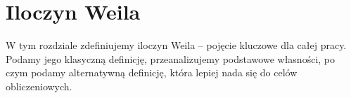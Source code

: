 \chapter{Iloczyn Weila}

W tym rozdziale zdefiniujemy iloczyn Weila -- pojęcie kluczowe dla całej pracy.
Podamy jego klasyczną definicję, przeanalizujemy podstawowe własności,
po czym podamy alternatywną definicję,
która lepiej nada się do celów obliczeniowych.







